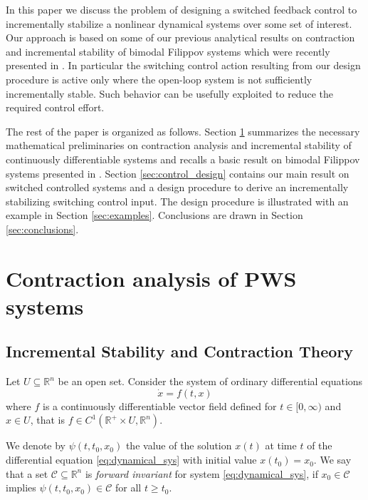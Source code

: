 \documentclass[letterpaper, 10 pt, conference]{ieeeconf}
\begin{document}
In this paper we discuss the problem of designing a switched feedback control to incrementally stabilize a nonlinear dynamical systems over some set of interest. Our approach is based on some of our previous analytical results on contraction and incremental stability of bimodal Filippov systems which were recently presented in \cite{fiore2015contraction}. In particular the switching control action resulting from our design procedure is active only where the open-loop system is not sufficiently incrementally stable. Such behavior can be usefully exploited to reduce the required control effort.

The rest of the paper is organized as follows. Section \ref{sec:background} summarizes the necessary mathematical preliminaries on contraction analysis and incremental stability of continuously differentiable systems and recalls a basic result on bimodal Filippov systems presented in \cite{fiore2015contraction}. Section \ref{sec:control_design} contains our main result on switched controlled systems and a design procedure to derive an incrementally stabilizing switching control input. The design procedure is illustrated with an example in Section \ref{sec:examples}. Conclusions are drawn in Section \ref{sec:conclusions}.



\section{Contraction analysis of PWS systems}
\label{sec:background}
\subsection{Incremental Stability and Contraction Theory}
Let $U\subseteq\mathbb{R}^n$ be an open set. Consider the system of ordinary differential equations
\begin{equation}
\label{eq:dynamical_sys}
\dot{x}=f(t,x)
\end{equation}
where $f$ is a continuously differentiable vector field defined for $t\in[0,\infty)$ and $x\in U$, that is $f\in C^1(\mathbb{R}^+\times U,\mathbb{R}^n)$.

We denote by $\psi(t,t_0,x_0)$ the value of the solution $x(t)$ at time $t$ of the differential equation \eqref{eq:dynamical_sys} with initial value $x(t_0)=x_0$.
We say that a set $\mathcal{C}\subseteq \mathbb{R}^n$ is \emph{forward invariant} for system \eqref{eq:dynamical_sys}, if $x_0 \in \mathcal{C}$ implies $\psi(t,t_0,x_0) \in \mathcal{C}$ for all $t\ge t_0$.
\end{document}
